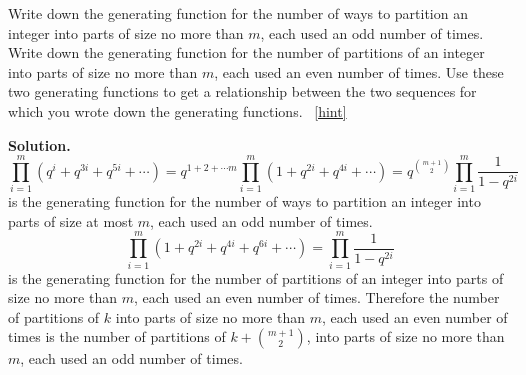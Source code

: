 \documentclass{book}
\begin{document}
\setcounter{project}{326}
\addtocounter{project}{-1}
\begin{activity}[]\label{activity-319}
\hypertarget{p-1681}{}%
Write down the generating function for the number of ways to partition an integer into parts of size no more than \(m\), each used an odd number of times. Write down the generating function for the number of partitions of an integer into parts of size no more than \(m\), each used an even number of times. Use these two generating functions to get a relationship between the two sequences for which you wrote down the generating functions.%
~\hfill{\tiny\hyperlink{a-326}{[hint]}\hypertarget{q-326}{}}\par\smallskip%
\noindent\textbf{Solution.}\hypertarget{solution-262}{}\quad%
\hypertarget{p-1683}{}%
%
\begin{equation*}
\displaystyle\prod_{i=1}^m (q^i+q^{3i}+q^{5i}+\cdots )= q^{1+2+\cdots m}\prod_{i=1}^m (1+q^{2i}+q^{4i}+\cdots )=q^{\binom{m+1}{2}}\prod_{i=1}^m\frac{1}{1-q^{2i}}
\end{equation*}
is the generating function for the number of ways to partition an integer into parts of size at most \(m\), each used an odd number of times.%
\begin{equation*}
\displaystyle
\prod_{i=1}^m (1 +q^{2i}+q^{4i}+q^{6i}+\cdots )=\prod_{i=1}^m \frac{1}{1-q^{2i}}
\end{equation*}
is the generating function for the number of partitions of an integer into parts of size no more than \(m\), each used an even number of times. Therefore the number of partitions of \(k\) into parts of size no more than \(m\), each used an even number of times is the number of partitions of \(k+\binom{m+1}{2}\), into parts of size no more than \(m\), each used an odd number of times.%
\end{activity}
\end{document}
